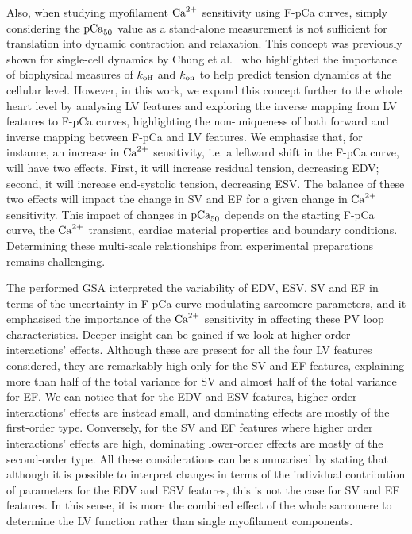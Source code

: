 \vspace{0.2cm}
Also, when studying myofilament $\textrm{Ca}^{2+}$ sensitivity using F-pCa curves, simply considering the $\textrm{pCa}_{50}$ value as a stand-alone measurement is not sufficient for translation into dynamic contraction and relaxation. This concept was previously shown for single-cell dynamics by Chung et al.~\cite{Chung:2016} who highlighted the importance of biophysical measures of $k_{\textrm{off}}$ and $k_{\textrm{on}}$ to help predict tension dynamics at the cellular level. However, in this work, we expand this concept further to the whole heart level by analysing LV features and exploring the inverse mapping from LV features to F-pCa curves, highlighting the non-uniqueness of both forward and inverse mapping between F-pCa and LV features. We emphasise that, for instance, an increase in $\textrm{Ca}^{2+}$ sensitivity, i.e. a leftward shift in the F-pCa curve, will have two effects. First, it will increase residual tension, decreasing EDV; second, it will increase end-systolic tension, decreasing ESV. The balance of these two effects will impact the change in SV and EF for a given change in $\textrm{Ca}^{2+}$ sensitivity. This impact of changes in $\textrm{pCa}_{50}$ depends on the starting F-pCa curve, the $\textrm{Ca}^{2+}$ transient, cardiac material properties and boundary conditions. Determining these multi-scale relationships from experimental preparations remains challenging.

\vspace{0.2cm}
The performed GSA interpreted the variability of EDV, ESV, SV and EF in terms of the uncertainty in F-pCa curve-modulating sarcomere parameters, and it emphasised the importance of the $\textrm{Ca}^{2+}$ sensitivity in affecting these PV loop characteristics. Deeper insight can be gained if we look at higher-order interactions' effects. Although these are present for all the four LV features considered, they are remarkably high only for the SV and EF features, explaining more than half of the total variance for SV and almost half of the total variance for EF. We can notice that for the EDV and ESV features, higher-order interactions' effects are instead small, and dominating effects are mostly of the first-order type. Conversely, for the SV and EF features where higher order interactions' effects are high, dominating lower-order effects are mostly of the second-order type. All these considerations can be summarised by stating that although it is possible to interpret changes in terms of the individual contribution of parameters for the EDV and ESV features, this is not the case for SV and EF features. In this sense, it is more the combined effect of the whole sarcomere to determine the LV function rather than single myofilament components.

